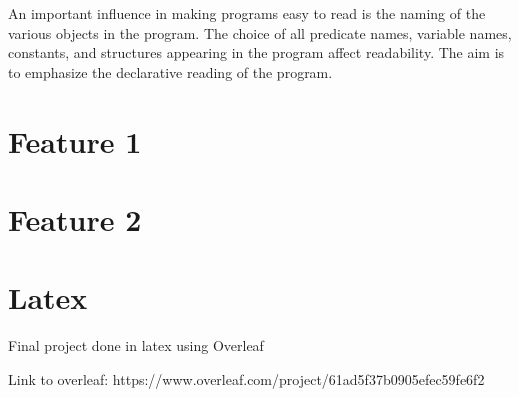 \documentclass[a4paper, 12pt]{article}
\begin{document}
An important influence in making programs easy to read is the naming of the various objects in the program. The choice of all predicate names, variable names, constants, and structures appearing in the program affect readability. The aim is to emphasize the declarative reading of the program. 

\newpage
\section{Feature 1}

\newpage
\section{Feature 2}

\newpage
\section{Latex}
Final project done in latex using Overleaf

Link to overleaf: https://www.overleaf.com/project/61ad5f37b0905efec59fe6f2

\newpage
\nocite{*} \printbibliography[heading=bibintoc,title={References}]{}
\end{document}
